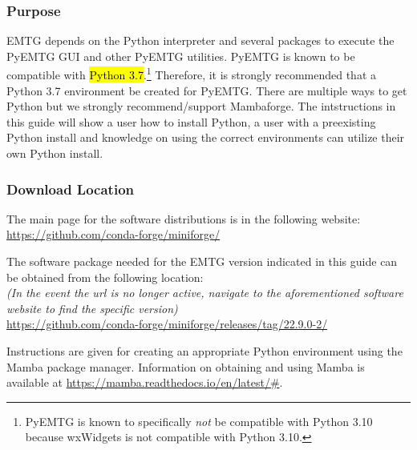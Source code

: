 
\subsubsection{Purpose}
\noindent \ac{EMTG} depends on the Python interpreter and several packages to execute the PyEMTG \ac{GUI} and other PyEMTG utilities. PyEMTG is known to be compatible with \hl{Python 3.7}.\footnote{PyEMTG is known to specifically \emph{not} be compatible with Python 3.10 because wxWidgets is not compatible with Python 3.10.} Therefore, it is strongly recommended that a Python 3.7 environment be created for PyEMTG. There are multiple ways to get Python but we strongly recommend/support Mambaforge. The intstructions in this guide will show a user how to install Python, a user with a preexisting Python install and knowledge on using the correct environments can utilize their own Python install.

\subsubsection{Download Location}
\noindent The main page for the software distributions is in the following website: \\
\url{https://github.com/conda-forge/miniforge/}

\noindent The software package needed for the EMTG version indicated in this guide can be obtained from the following location: \\
\emph{(In the event the url is no longer active, navigate to the aforementioned software website to find the specific version)} \\
\url{https://github.com/conda-forge/miniforge/releases/tag/22.9.0-2/}

\noindent Instructions are given for creating an appropriate Python environment using the Mamba package manager. Information on obtaining and using Mamba is available at \url{https://mamba.readthedocs.io/en/latest/#}. 

